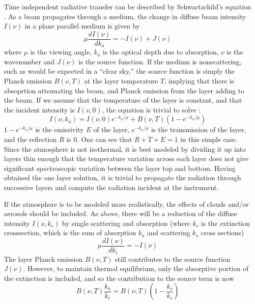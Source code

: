 \documentclass[11pt]{article}
\begin{document}
Time independent radiative transfer can be described by Schwartzchild's 
equation \cite{lio:80,goo:89}. As a beam propagates through a medium, the 
change in diffuse beam intensity $I(\nu)$ in a plane parallel medium is 
given by 
\[
\mu \frac{dI(\nu)}{dk_{a}} = -I(\nu) + J(\nu)
\]
where $\mu$ is the viewing angle, $k_{a}$ is the optical depth due to 
absorption, $\nu$ is the wavenumber and $J(\nu)$ is the source function. If 
the medium is nonscattering, such as would be expected in a ``clear sky,'' 
the source function is simply the Planck emission $B(\nu,T)$ at the
layer temperature $T$, implying that there is absoprtion attenuating the beam,
and  Planck emission from the layer adding to the beam. If we assume that the
temperature of the layer is constant, and that the incident intensity is 
$I(\nu,0)$, the equation is trivial to solve : 
\[
I(\nu,k_{a}) = I(\nu,0) e^{-k_{a}/\mu} + B(\nu,T)(1 - e^{-k_{a}/\mu})
\]
$1-e^{-k_{a}/\mu}$ is the emissivity $E$ of the layer, $e^{-k_{a}/\mu}$ is 
the transmission of the layer, and the reflection $R$ is 0. One can see that 
$R+T+E = 1$ in this simple case. Since the atmosphere is not isothermal, it 
is best modeled by dividing it up into layers thin enough that the 
temperature variation across each layer does not give significant 
spectroscopic variation between the layer top and bottom. Having obtained 
the one layer solution, it is trivial to propagate the radiation through 
successive layers and compute the radiation incident at the instrument. 

If the atmosphere is to be modeled more realistically, the effects of 
clouds and/or aerosols should be included. As above, there will be 
a reduction of the diffuse intensity $I(\nu,k_{e})$ by single scattering and
absorption (where $k_{e}$ is the extinction crosssection, which is the sum 
of absorption $k_{a}$ and scattering $k_{s}$ cross sections) 
\cite{lio:80,goo:89}
\[
\mu \frac{dI(\nu)}{dk_{e}} = -I(\nu)
\]
The layer Planck emission $B(\nu,T)$ still contributes to the source function 
$J(\nu)$. However, to maintain thermal equilibrium, only the absorptive 
portion of the extinction is included, and so the contribution to the
source term is now
\[
B(\nu,T) \frac{k_{a}}{k_{e}} = B(\nu,T) \left(1 - \frac{k_{s}}{k_{e}} \right) 
\]
\end{document}
